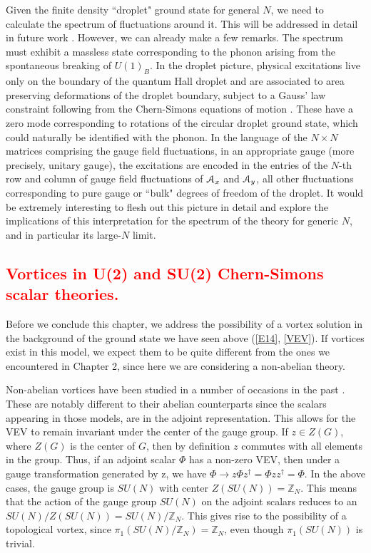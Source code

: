 Given the finite density ``droplet" ground state for general $N$, we need to calculate the spectrum of fluctuations around it. This will be addressed in detail in future work  \cite{ongoing}. However, we can already make a few remarks.  The spectrum must exhibit a massless state corresponding to the phonon arising from the spontaneous breaking of $U(1)_B$. In the droplet picture,  physical excitations live only on the boundary of the quantum Hall droplet and are associated to area preserving deformations of the droplet boundary, subject to a Gauss' law constraint following from the Chern-Simons equations of motion \cite{Polychronakos:2001mi}.  These have a zero mode corresponding to rotations of the circular droplet ground state, which could naturally be identified with the phonon.  In the language of the $N\times N$ matrices comprising the gauge field fluctuations, in an appropriate gauge (more precisely, unitary gauge), the excitations are encoded in the entries of the $N$-th row and column of gauge field fluctuations of ${\cal A}_x$ and ${\cal A}_y$, all other fluctuations corresponding to pure gauge or ``bulk" degrees of freedom  of the droplet. 
It would be extremely interesting to flesh out this picture in detail and explore the implications of this interpretation for the spectrum of the theory for generic $N$, and in particular its large-$N$ limit.

\textcolor{red}{\section{Vortices in U(2) and SU(2) Chern-Simons scalar theories.}}
Before we conclude this chapter, we address the possibility of a vortex solution in the background of the ground state we have seen above (\ref{E14}, \ref{VEV}). If vortices exist in this model, we expect them to be quite different from the ones we encountered in Chapter 2, since here we are considering a non-abelian theory. 

Non-abelian vortices have been studied in a number of occasions in the past \cite{deVega:1986eu, Kumar:1986yz, Blazquez-Salcedo:2013roa, NavarroLerida:2009dm}. These are notably different to their abelian counterparts since the scalars appearing in those models, are in the adjoint representation. This allows for the VEV to remain invariant under the center of the gauge group. If $z\in Z(G)$, where $Z(G)$ is the center of $G$, then by definition $z$ commutes with all elements in the group. Thus, if an adjoint scalar $\Phi$ has a non-zero VEV, then under a gauge transformation generated by z, we have $\Phi \rightarrow z\Phi z^{\dag} =\Phi z z^{\dag} = \Phi$. In the above cases, the gauge group is $SU(N)$ with center $Z(SU(N)) =\mathbb{Z}_N$. This means that the action of the gauge group $SU(N)$ on the adjoint scalars reduces to an $SU(N)/Z(SU(N))= SU(N)/\mathbb{Z}_N$. This gives rise to the possibility of a topological vortex, since $\pi_1(SU(N)/\mathbb{Z}_N)=\mathbb{Z}_N$, even though $\pi_1(SU(N))$ is trivial.

